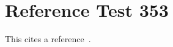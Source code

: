 \documentclass{article}
\begin{document}
\section{Reference Test 353}
This cites a reference~\cite{test353}.

\end{document}
